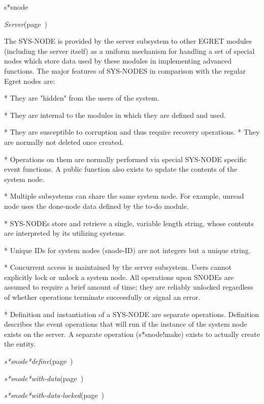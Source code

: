 \begin{description}
\item [Name:]  s*snode

\item [Layer:]
{\sl Server}\hfill(page~\pageref{Server})

\item [Description:]

The SYS-NODE is provided by the server subsystem to other
EGRET modules (including the server itself) as a uniform
mechanism for handling a set of special nodes which store
data used by these modules in implementing advanced
functions. The major features of SYS-NODES in comparison
with the regular Egret nodes are:

* They are "hidden" from the users of the system.

* They are internal to the modules in which they are
  defined and used.

* They are susceptible to corruption and thus require
  recovery operations.
*  They are normally not deleted once created.

* Operations on them are normally performed via special
  SYS-NODE specific event functions. A public function
  also exists to update the contents of the system node.

* Multiple subsystems can share the same system node. For
  example, unread node uses the done-node data defined by
  the to-do module.

* SYS-NODEs store and retrieve a single, variable length
  string, whose contents are interpreted by its utilizing
  systems.

* Unique IDs for system nodes (snode-ID) are not integers
  but a unique string.

* Concurrent access is maintained by the server
  subsystem. Users cannot explicitly lock or unlock a
  system node. All operations upon SNODEs are assumed to
  require a brief amount of time; they are reliably
  unlocked regardless of whether operations terminate
  successfully or signal an error.

* Definition and instantiation of a SYS-NODE are separate
  operations. Definition describes the event operations
  that will run if the instance of the system node exists
  on the server. A separate operation (s*snode!make)
  exists to actually create the entity. 

\item [Attributes:]

\item [Operations:]
\item {\sl s*snode*define}\hfill(page~\pageref{s*snode*define})
\item {\sl s*snode*with-data}\hfill(page~\pageref{s*snode*with-data})
\item {\sl s*snode*with-data-locked}\hfill(page~\pageref{s*snode*with-data-locked})


\end{description}

